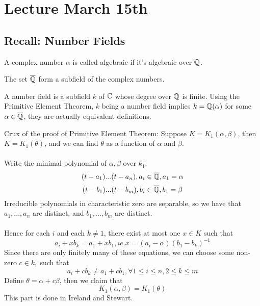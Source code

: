 \section{Lecture March 15th}

\subsection{Recall: Number Fields}

\begin{definition}
A complex number $\alpha$ is called algebraic if it's algebraic over $\mathbb{Q}$.
\end{definition}

\begin{proposition}
The set $\overline{\mathbb{Q}}$ form a subfield of the complex numbers.
\end{proposition}

\begin{definition}
A number field is a subfield $k$ of $\mathbb{C}$ whose degree over $\mathbb{Q}$ is finite. Using the Primitive Element Theorem, $k$ being a number field implies $k = \mathbb{Q}(\alpha)$ for some $\alpha \in \overline{\mathbb{Q}}$, they are actually equivalent definitions.
\end{definition}

\begin{remark}
Crux of the proof of Primitive Element Theorem: Suppose $K = K_1(\alpha, \beta)$, then $K = K_1(\theta)$, and we can find $\theta$ as a function of $\alpha$ and $\beta$.\\\\
Write the minimal polynomial of $\alpha, \beta$ over $k_1$:
\[(t - a_1)...(t- a_n), a_i \in \overline{\mathbb{Q}}, a_1 = \alpha\]
\[(t - b_1)...(t- b_m), b_i \in \overline{\mathbb{Q}}, b_1 = \beta\]
Irreducible polynomials in characteristic zero are separable, so we have that $a_1, ..., a_n$ are distinct, and $b_1, ..., b_m$ are distinct.\\\\
Hence for each $i$ and each $k \neq 1$, there exist at most one $x \in K$ such that
\[a_i + xb_k = a_1 + xb_1, ie. x = (a_i - \alpha)(b_1 - b_k)^{-1}\]
Since there are only finitely many of these equations, we can choose some non-zero $c \in k_1$ such that
\[a_i + cb_k \neq a_1 + cb_1, \forall 1 \leq i \leq n, 2 \leq k \leq m\]
Define $\theta = \alpha + c \beta$, then we claim that
\[K_1(\alpha, \beta) = K_1(\theta)\]
This part is done in Ireland and Stewart.
\end{remark}

